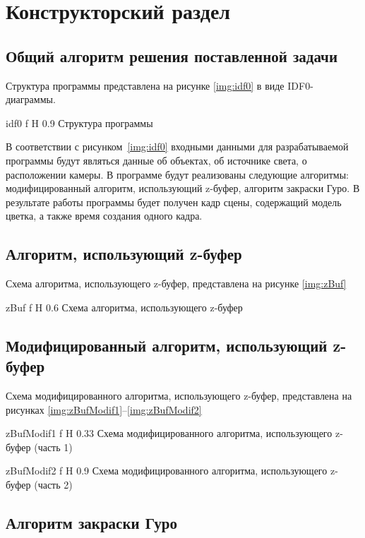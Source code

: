 \chapter{Конструкторский раздел}

\section{Общий алгоритм решения поставленной задачи}

Структура программы представлена на рисунке \ref{img:idf0} в виде IDF0-диаграммы.

{idf0} 
{f}
{H}
{0.9\textwidth} 
{Структура программы}

В соответствии с рисунком~\ref{img:idf0} входными данными для разрабатываемой программы будут являться данные об объектах, об источнике света, о расположении камеры. В программе будут реализованы следующие алгоритмы: модифицированный алгоритм, использующий z-буфер, алгоритм закраски Гуро. В результате работы программы будет получен кадр сцены, содержащий модель цветка, а также время  создания одного кадра.

\section{Алгоритм, использующий z-буфер}

Схема алгоритма, использующего z-буфер, представлена на рисунке \ref{img:zBuf}

{zBuf} 
{f}
{H}
{0.6\textwidth} 
{Схема алгоритма, использующего z-буфер}

\section{Модифицированный алгоритм, использующий z-буфер}

Схема модифицированного алгоритма, использующего z-буфер, представлена на рисунках \ref{img:zBufModif1}--\ref{img:zBufModif2}

{zBufModif1} 
{f}
{H}
{0.33\textwidth} 
{Схема модифицированного алгоритма, использующего z-буфер (часть 1)}

{zBufModif2} 
{f}
{H}
{0.9\textwidth} 
{Схема модифицированного алгоритма, использующего z-буфер (часть 2)}

\section{Алгоритм закраски Гуро}

